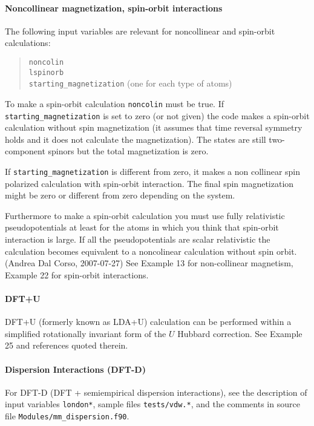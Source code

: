 \documentclass[12pt,a4paper]{article}
\begin{document}
\paragraph{Noncollinear magnetization, spin-orbit interactions}

The following input variables are relevant for noncollinear and
spin-orbit calculations: 
\begin{quote}
      \texttt{noncolin}\\
      \texttt{lspinorb}\\
      \texttt{starting\_magnetization} (one for each type of atoms)
\end{quote}
To make a spin-orbit calculation \texttt{noncolin} must be true. 
If \texttt{starting\_magnetization} is set to zero (or not given) 
the code makes a spin-orbit calculation without spin magnetization 
(it assumes that time reversal symmetry holds and it does not calculate 
the magnetization). The states are still two-component spinors but the
total magnetization is zero. 

If \texttt{starting\_magnetization} is different from zero, it makes a non
collinear spin polarized calculation with spin-orbit interaction. The 
final spin magnetization might be zero or different from zero depending 
on the system. 

Furthermore to make a spin-orbit calculation you must use fully
relativistic pseudopotentials at least for the atoms in which you
think that spin-orbit interaction is large. If all the pseudopotentials 
are scalar
relativistic the calculation becomes equivalent to a noncolinear
calculation without spin orbit. (Andrea Dal Corso, 2007-07-27)
See Example 13 for non-collinear magnetism, Example 22
for spin-orbit interactions.

\paragraph{DFT+U}
DFT+U (formerly known as LDA+U) calculation can be
performed within a simplified rotationally invariant form 
of the $U$ Hubbard correction. See Example 25 and references 
quoted therein.

\paragraph{Dispersion Interactions (DFT-D)}
For DFT-D (DFT + semiempirical dispersion interactions), see the
description of input variables \texttt{london*}, sample files
\texttt{tests/vdw.*}, and the comments in source file
\texttt{Modules/mm\_dispersion.f90}.
\end{document}
